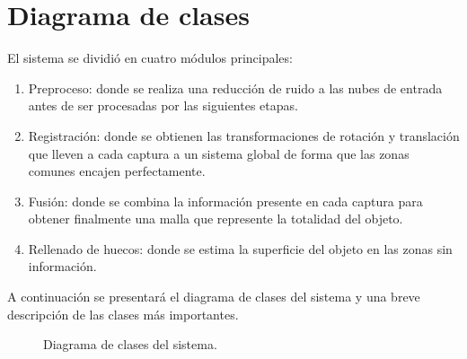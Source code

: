 \section{Diagrama de clases}
El sistema se dividió en cuatro módulos principales:
\begin{enumerate}
	\item Preproceso:
		donde se realiza una reducción de ruido a las nubes de entrada
		antes de ser procesadas por las siguientes etapas.
	\item Registración:
		donde se obtienen las transformaciones de rotación y translación
		que lleven a cada captura a un sistema global
		de forma que las zonas comunes encajen perfectamente.
	\item Fusión:
		donde se combina la información presente en cada captura
		para obtener finalmente una malla que represente la totalidad del objeto.
	\item Rellenado de huecos:
		donde se estima la superficie del objeto en las zonas sin información.
\end{enumerate}

A continuación se presentará el diagrama de clases del sistema y una breve descripción de las clases más importantes.

\begin{figure}[h]
	\caption{\label{fig:diagrama_de_clases}Diagrama de clases del sistema.}
\end{figure}

